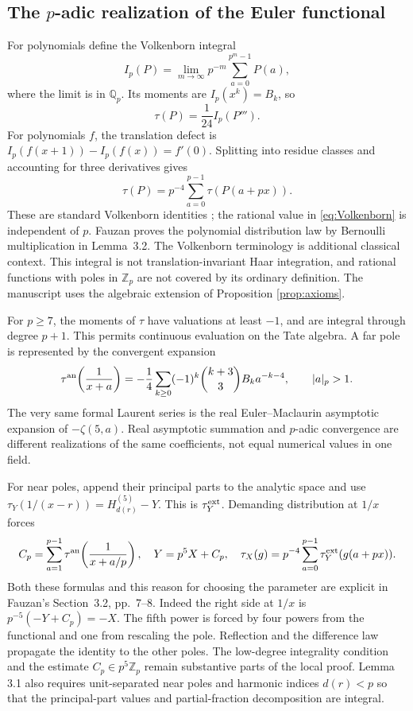 \documentclass[11pt]{article}
\theoremstyle{definition}
\theoremstyle{remark}\newtheorem*{remark}{Remark}
\newcommand{\Q}{\mathbb Q}
\newcommand{\Z}{\mathbb Z}
\begin{document}
\subsection{The \texorpdfstring{$p$}{p}-adic realization of the Euler functional}
For polynomials define the Volkenborn integral
\[
 I_p(P)=\lim_{m\to\infty}p^{-m}\sum_{a=0}^{p^m-1}P(a),
\]
where the limit is in $\Q_p$. Its moments are $I_p(x^k)=B_k$, so
\begin{equation}\label{eq:Volkenborn}
 \tau(P)=\frac1{24}I_p(P''').
\end{equation}
For polynomials $f$, the translation defect is
$I_p(f(x+1))-I_p(f(x))=f'(0)$.
Splitting into residue classes and accounting for three derivatives gives
\[
 \tau(P)=p^{-4}\sum_{a=0}^{p-1}\tau(P(a+px)).
\]
These are standard Volkenborn identities \cite{Volkenborn,HuKim}; the rational
value in \eqref{eq:Volkenborn} is independent of $p$.
Fauzan proves the polynomial distribution law by Bernoulli multiplication
in Lemma~3.2. The Volkenborn terminology is additional classical context.
This integral is not translation-invariant Haar integration, and rational
functions with poles in $\Z_p$ are not covered by its ordinary definition.
The manuscript uses the algebraic extension of Proposition \ref{prop:axioms}.

For $p\ge7$, the moments of $\tau$ have valuations at least $-1$, and are
integral through degree $p+1$. This permits continuous evaluation on the Tate
algebra. A far pole is represented by the convergent expansion
\begin{equation}\label{eq:farpole}
 \tau^{\rm an}\!\left(\frac1{x+a}\right)
 =-\frac14\sum_{k\ge0}(-1)^k\binom{k+3}{3}B_k a^{-k-4},
 \qquad |a|_p>1.
\end{equation}
The very same formal Laurent series is the real Euler--Maclaurin asymptotic
expansion of $-\zeta(5,a)$. Real asymptotic summation and $p$-adic convergence
are different realizations of the same coefficients, not equal numerical
values in one field.

For near poles, append their principal parts to the analytic space and use
$\tau_Y(1/(x-r))=H_{d(r)}^{(5)}-Y$. This is $\tau_Y^{\rm ext}$.
Demanding distribution at $1/x$ forces
\begin{equation}\label{eq:param}
 C_p=\sum_{a=1}^{p-1}\tau^{\rm an}\!\left(\frac1{x+a/p}\right),\quad
 Y=p^5X+C_p,\quad
 \tau_X(g)=p^{-4}\sum_{a=0}^{p-1}\tau_Y^{\rm ext}(g(a+px)).
\end{equation}
Both these formulas and this reason for choosing the parameter are explicit
in Fauzan's Section~3.2, pp.~7--8.
Indeed the right side at $1/x$ is $p^{-5}(-Y+C_p)=-X$.
The fifth power is forced by four powers from the functional and one from
rescaling the pole. Reflection and the difference law propagate the identity
to the other poles. The low-degree integrality condition and the estimate
$C_p\in p^5\Z_p$ remain substantive parts of the local proof. Lemma 3.1 also
requires unit-separated near poles and harmonic indices $d(r)<p$ so that the
principal-part values and partial-fraction decomposition are integral.
\end{document}
